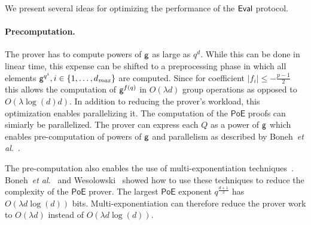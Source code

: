 We present several ideas for optimizing the performance of the $\textsf{{Eval}}$ protocol.

\paragraph{Precomputation.} The prover has to compute powers of $\mathsf{g}$ as large as $q^d$. While this can be done in linear time, this expense can be shifted to a preprocessing phase in which all elements $\mathsf{g}^{q^i}, i \in \{1, \ldots, d_{\it max}\}$ are computed. Since for coefficient $|f_i|\leq -\frac{p-1}{2}$ this allows the computation of $\mathsf{g}^{f(q)}$ in $O(\lambda d)$ group operations as opposed to $O(\lambda \log(d) d)$.
In addition to reducing the prover's workload, this optimization enables parallelizing it. The computation of the $\textsf{PoE}$ proofs can simiarly be parallelized. The prover can express each $Q$ as a power of $\mathsf{g}$ which enables pre-computation of powers of $\mathsf{g}$ and parallelism as described by Boneh~\emph{et al.}~\cite{C:BonBunFis19}.

The pre-computation also enables the use of multi-exponentiation techniques~\cite{pippenger1980evaluation}. Boneh~\emph{et al.}~\cite{C:BonBunFis19} and Wesolowski~\cite{EC:Wesolowski19} showed how to use these techniques to reduce the complexity of the $\textsf{PoE}$ prover. The largest $\textsf{PoE}$ exponent $q^{\frac{d+1}{2}}$ has $O(\lambda d \log(d))$ bits. Multi-exponentiation can therefore reduce the prover work to $O(\lambda d)$ instead of $O(\lambda d \log(d))$.


